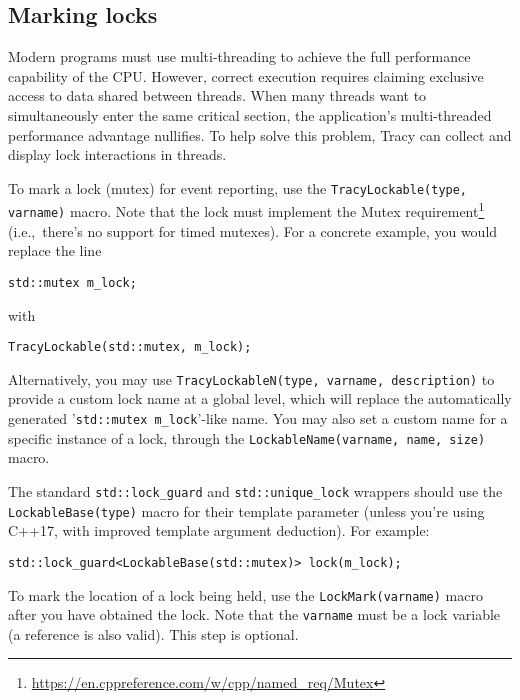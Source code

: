 \documentclass[hidelinks,titlepage,a4paper,twoside]{article}
\begin{document}
\subsection{Marking locks}

Modern programs must use multi-threading to achieve the full performance capability of the CPU. However, correct execution requires claiming exclusive access to data shared between threads. When many threads want to simultaneously enter the same critical section, the application's multi-threaded performance advantage nullifies. To help solve this problem, Tracy can collect and display lock interactions in threads.

To mark a lock (mutex) for event reporting, use the \texttt{TracyLockable(type, varname)} macro. Note that the lock must implement the Mutex requirement\footnote{\url{https://en.cppreference.com/w/cpp/named_req/Mutex}} (i.e.,\ there's no support for timed mutexes). For a concrete example, you would replace the line

\begin{lstlisting}
std::mutex m_lock;
\end{lstlisting}

with

\begin{lstlisting}
TracyLockable(std::mutex, m_lock);
\end{lstlisting}

Alternatively, you may use \texttt{TracyLockableN(type, varname, description)} to provide a custom lock name at a global level, which will replace the automatically generated '\texttt{std::mutex m\_lock}'-like name. You may also set a custom name for a specific instance of a lock, through the \texttt{LockableName(varname, name, size)} macro.

The standard \texttt{std::lock\_guard} and \texttt{std::unique\_lock} wrappers should use the \texttt{LockableBase(type)} macro for their template parameter (unless you're using C++17, with improved template argument deduction). For example:

\begin{lstlisting}
std::lock_guard<LockableBase(std::mutex)> lock(m_lock);
\end{lstlisting}

To mark the location of a lock being held, use the \texttt{LockMark(varname)} macro after you have obtained the lock. Note that the \texttt{varname} must be a lock variable (a reference is also valid). This step is optional.
\end{document}
